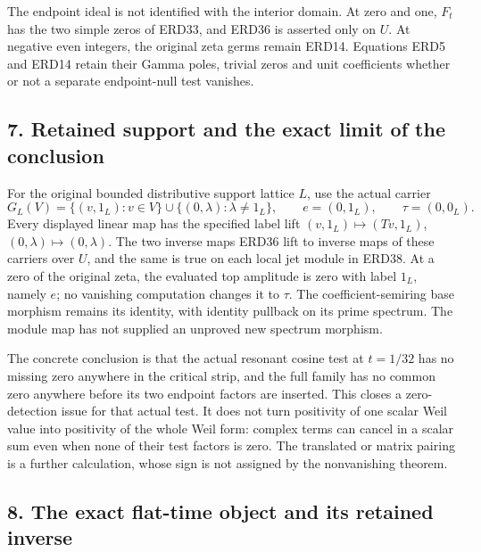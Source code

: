 \documentclass[
  10pt,
  a4paper,
]{article}
\begin{document}
The endpoint ideal is not identified with the interior domain. At zero
and one, \(F_t\) has the two simple zeros of ERD33, and ERD36 is
asserted only on \(U\). At negative even integers, the original zeta
germs remain ERD14. Equations ERD5 and ERD14 retain their Gamma poles,
trivial zeros and unit coefficients whether or not a separate
endpoint-null test vanishes.

\subsection{7. Retained support and the exact limit of the
conclusion}\label{retained-support-and-the-exact-limit-of-the-conclusion}

For the original bounded distributive support lattice \(L\), use the
actual carrier \[
 G_L(V)=\{(v,1_L):v\in V\}
       \cup\{(0,\lambda):\lambda\ne1_L\},\qquad
 e=(0,1_L),\qquad \tau=(0,0_L).
 \tag{ERD39}
\] Every displayed linear map has the specified label lift
\((v,1_L)\mapsto(Tv,1_L)\), \((0,\lambda)\mapsto(0,\lambda)\). The two
inverse maps ERD36 lift to inverse maps of these carriers over \(U\),
and the same is true on each local jet module in ERD38. At a zero of the
original zeta, the evaluated top amplitude is zero with label \(1_L\),
namely \(e\); no vanishing computation changes it to \(\tau\). The
coefficient-semiring base morphism remains its identity, with identity
pullback on its prime spectrum. The module map has not supplied an
unproved new spectrum morphism.

The concrete conclusion is that the actual resonant cosine test at
\(t=1/32\) has no missing zero anywhere in the critical strip, and the
full family has no common zero anywhere before its two endpoint factors
are inserted. This closes a zero-detection issue for that actual test.
It does not turn positivity of one scalar Weil value into positivity of
the whole Weil form: complex terms can cancel in a scalar sum even when
none of their test factors is zero. The translated or matrix pairing is
a further calculation, whose sign is not assigned by the nonvanishing
theorem.

\subsection{8. The exact flat-time object and its retained
inverse}\label{the-exact-flat-time-object-and-its-retained-inverse}
\end{document}
